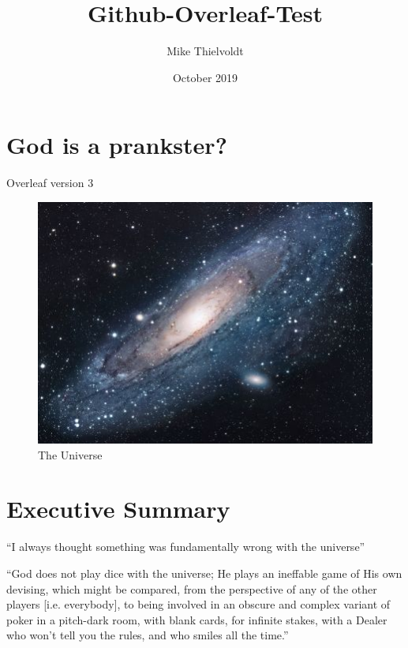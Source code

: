 \documentclass{article}
\title{Github-Overleaf-Test}
\author{Mike Thielvoldt}
\date{October 2019}
\begin{document}
\maketitle

\section{God is a prankster?}

Overleaf version 3

\begin{figure}[h!]
\centering
\includegraphics[scale=1.7]{universe}
\caption{The Universe}
\label{fig:universe}
\end{figure}


\section{Executive Summary}
``I always thought something was fundamentally wrong with the universe'' \citep{adams1995hitchhiker}

``God does not play dice with the universe; He plays an ineffable game of His own devising, which might be compared, from the perspective of any of the other players [i.e. everybody], to being involved in an obscure and complex variant of poker in a pitch-dark room, with blank cards, for infinite stakes, with a Dealer who won't tell you the rules, and who smiles all the time.'' \citep{pratchett1990goodomens}



\end{document}
